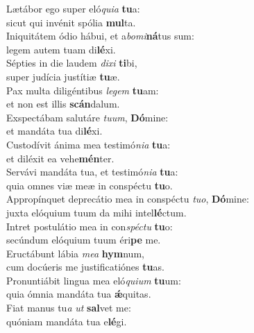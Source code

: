 \evenverse Lætábor ego super eló\textit{qui}\textit{a} \textbf{tu}a:~\*\\
\evenverse sicut qui invénit spólia \textbf{mul}ta.\\
\oddverse Iniquitátem ódio hábui, et a\textit{bo}\textit{mi}\textbf{ná}tus sum:~\*\\
\oddverse legem autem tuam di\textbf{lé}xi.\\
\evenverse Sépties in die laudem \textit{di}\textit{xi} \textbf{ti}bi,~\*\\
\evenverse super judícia justítiæ \textbf{tu}æ.\\
\oddverse Pax multa diligéntibus \textit{le}\textit{gem} \textbf{tu}am:~\*\\
\oddverse et non est illis \textbf{scán}dalum.\\
\evenverse Exspectábam salutáre \textit{tu}\textit{um}, \textbf{Dó}mine:~\*\\
\evenverse et mandáta tua di\textbf{lé}xi.\\
\oddverse Custodívit ánima mea testimó\textit{ni}\textit{a} \textbf{tu}a:~\*\\
\oddverse et diléxit ea vehe\textbf{mén}ter.\\
\evenverse Servávi mandáta tua, et testimó\textit{ni}\textit{a} \textbf{tu}a:~\*\\
\evenverse quia omnes viæ meæ in conspéctu \textbf{tu}o.\\
\oddverse Appropínquet deprecátio mea in conspéctu \textit{tu}\textit{o}, \textbf{Dó}mine:~\*\\
\oddverse juxta elóquium tuum da mihi intel\textbf{lé}ctum.\\
\evenverse Intret postulátio mea in con\textit{spé}\textit{ctu} \textbf{tu}o:~\*\\
\evenverse secúndum elóquium tuum éri\textbf{pe} me.\\
\oddverse Eructábunt lábia \textit{me}\textit{a} \textbf{hym}num,~\*\\
\oddverse cum docúeris me justificatiónes \textbf{tu}as.\\
\evenverse Pronuntiábit lingua mea eló\textit{qui}\textit{um} \textbf{tu}um:~\*\\
\evenverse quia ómnia mandáta tua \textbf{ǽ}quitas.\\
\oddverse Fiat manus tu\textit{a} \textit{ut} \textbf{sal}vet me:~\*\\
\oddverse quóniam mandáta tua e\textbf{lé}gi.\\

